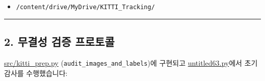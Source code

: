 \documentclass[10.5pt,a4paper]{article}
\begin{document}
\begin{itemize}[leftmargin=1.5em,itemsep=2pt]
\item \texttt{/\allowbreak{}content/\allowbreak{}drive/\allowbreak{}MyDrive/\allowbreak{}KITTI\_\allowbreak{}Tracking/\allowbreak{}}
\end{itemize}

\par\noindent\rule{\textwidth}{0.4pt}\par\medskip

\subsection{2. 무결성 검증 프로토콜}

\href{https://github.com/Heisnotanimposter/Totalcare\_autonomous\_driving\_Yolov5/blob/main/src/kitti\_prep.py}{src/kitti\_prep.py} (\texttt{audit\_\allowbreak{}images\_\allowbreak{}and\_\allowbreak{}labels})에 구현되고 \href{https://github.com/Heisnotanimposter/Totalcare\_autonomous\_driving\_Yolov5/blob/main/untitled63.py}{untitled63.py}에서 초기 감사를 수행했습니다:
\end{document}
